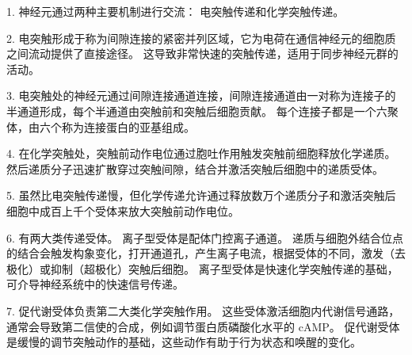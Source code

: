 1. 神经元通过两种主要机制进行交流：
电突触传递和化学突触传递。 


2. 电突触形成于称为间隙连接的紧密并列区域，它为电荷在通信神经元的细胞质之间流动提供了直接途径。 
这导致非常快速的突触传递，适用于同步神经元群的活动。 


3. 电突触处的神经元通过间隙连接通道连接，间隙连接通道由一对称为连接子的半通道形成，每个半通道由突触前和突触后细胞贡献。 
每个连接子都是一个六聚体，由六个称为连接蛋白的亚基组成。 


4. 在化学突触处，突触前动作电位通过胞吐作用触发突触前细胞释放化学递质。 
然后递质分子迅速扩散穿过突触间隙，结合并激活突触后细胞中的递质受体。 


5. 虽然比电突触传递慢，但化学传递允许通过释放数万个递质分子和激活突触后细胞中成百上千个受体来放大突触前动作电位。 


6. 有两大类传递受体。 
离子型受体是配体门控离子通道。 
递质与细胞外结合位点的结合会触发构象变化，打开通道孔，产生离子电流，根据受体的不同，激发（去极化）或抑制（超极化）突触后细胞。 
离子型受体是快速化学突触传递的基础，可介导神经系统中的快速信号传递。 


7. 促代谢受体负责第二大类化学突触作用。 
这些受体激活细胞内代谢信号通路，通常会导致第二信使的合成，例如调节蛋白质磷酸化水平的 cAMP。 
促代谢受体是缓慢的调节突触动作的基础，这些动作有助于行为状态和唤醒的变化。


%
